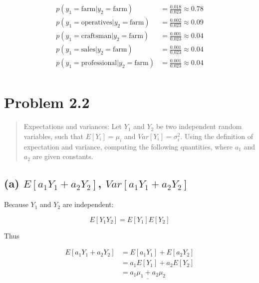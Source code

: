\documentclass[
  letterpaper,
  DIV=11,
  numbers=noendperiod]{scrreprt}
\begin{document}
\[
\begin{aligned}
    p(y_1 = \text{farm} | y_2 = \text{farm}) &= \frac{0.018}{0.023} \approx 0.78\\
    p(y_1 = \text{operatives} | y_2 = \text{farm}) &=\frac{0.002}{0.023} \approx 0.09\\
    p(y_1 = \text{craftsman} | y_2 = \text{farm}) &= \frac{0.001}{0.023} \approx 0.04\\
    p(y_1 = \text{sales} | y_2 = \text{farm}) &= \frac{0.001}{0.023} \approx 0.04\\
    p(y_1 = \text{professional} | y_2 = \text{farm}) &= \frac{0.001}{0.023} \approx 0.04\\
\end{aligned}
\]

\hypertarget{problem-2.2}{%
\section{Problem 2.2}\label{problem-2.2}}

\begin{quote}
Expectations and variances: Let \(Y_1\) and \(Y_2\) be two independent
random variables, such that \(E[Y_i]=\mu_i\) and
\(Var[Y_i] = \sigma_{i}^2\). Using the definition of expectation and
variance, computing the following quantities, where \(a_1\) and \(a_2\)
are given constants.
\end{quote}

\hypertarget{a-ea_1-y_1-a_2-y_2-vara_1-y_1-a_2-y_2}{%
\subsection{\texorpdfstring{(a) \(E[a_1 Y_1 +a_2 Y_2]\),
\(Var[a_1 Y_1 + a_2 Y_2]\)}{(a) E{[}a\_1 Y\_1 +a\_2 Y\_2{]}, Var{[}a\_1 Y\_1 + a\_2 Y\_2{]}}}\label{a-ea_1-y_1-a_2-y_2-vara_1-y_1-a_2-y_2}}

Because \(Y_1\) and \(Y_2\) are independent:

\[
E[Y_1 Y_2] = E[Y_1] E[Y_2]
\]

Thus

\[
\begin{aligned}
  E[a_1 Y_1 + a_2 Y_2] &= E[a_1 Y_1] + E[a_2 Y_2]\\
                       &= a_1 E[Y_1] + a_2 E[Y_2]\\
                       &= \underline{a_1 \mu_1 + a_2 \mu_{2}}\\
\end{aligned}
\]
\end{document}
